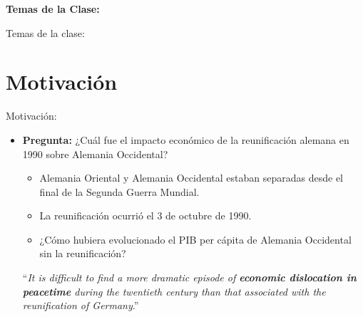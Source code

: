 \documentclass[10pt, xcolor=dvipsnames]{beamer}
\subtitle{Control Sintético}
\begin{document}
	\beamertemplatenavigationsymbolsempty	
\begin{frame}[plain]%
	\titlepage
	\vspace{-0.4cm}
\textbf{Temas de la Clase:} \\ \vspace{0.3cm}
	\tableofcontents
\end{frame}

\begin{frame}{Temas de la clase:}
	\tableofcontents
\end{frame}

\section{Motivación}

\begin{frame}{Motivación: \texorpdfstring{\citet{abadie_comparative_2015}}{Abadie et al. (2015)}}
\begin{itemize}\setlength{\itemsep}{1em}
	\item \textbf{Pregunta:} ¿Cuál fue el impacto económico de la reunificación alemana en 1990 sobre Alemania Occidental?
    \vspace{0.3em}
	\begin{itemize}\setlength{\itemsep}{0.3em}
		\item Alemania Oriental y Alemania Occidental estaban separadas desde el final de la Segunda Guerra Mundial.		
		\item La reunificación ocurrió el 3 de octubre de 1990.	%
		\item ¿Cómo hubiera evolucionado el PIB per cápita de Alemania Occidental sin la reunificación?		
	\end{itemize}
	\vspace{0.3cm}
	``\textit{It is difficult to find a more dramatic episode of \textbf{economic dislocation in peacetime} during the twentieth century than that associated with the reunification of Germany}.''
	\citet{burda2001reunification} 
\end{itemize}	
\end{frame}
\end{document}
